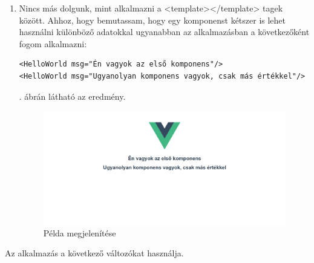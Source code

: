 \begin{enumerate}
 \item Nincs más dolgunk, mint alkalmazni a <template></template> tagek között. Ahhoz, hogy bemutassam, hogy egy komponenst kétszer is lehet használni különböző adatokkal ugyanabban az alkalmazásban a következőként fogom alkalmazni:

\begin{verbatim}
<HelloWorld msg="Én vagyok az első komponens"/>
<HelloWorld msg="Ugyanolyan komponens vagyok, csak más értékkel"/>
\end{verbatim}
. ábrán látható az eredmény.
\begin{figure}[h!]
	\centering
	\includegraphics[scale=0.25]{images/1617372108829.png}
	\caption{Példa megjelenítése}
	\label{fig:result}
	\end{figure}
\end{enumerate}


Az alkalmazás a következő változókat használja.

